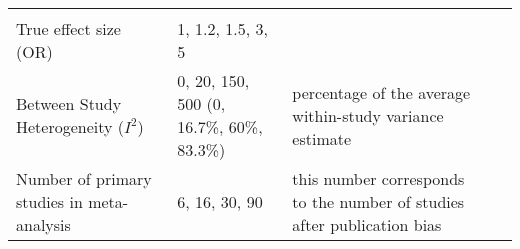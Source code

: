 \documentclass[english,doc,floatsintext]{apa6}
\begin{document}
\begin{longtable}[]{@{}lllll@{}}
\begin{minipage}[t]{0.26\columnwidth}
\strut
\end{minipage} & \begin{minipage}[t]{0.04\columnwidth}\raggedright
\strut
\end{minipage} & \begin{minipage}[t]{0.01\columnwidth}\raggedright
\strut
\end{minipage}\tabularnewline
\begin{minipage}[t]{0.20\columnwidth}\raggedright
True effect size (OR)\strut
\end{minipage} & \begin{minipage}[t]{0.35\columnwidth}\raggedright
1, 1.2, 1.5, 3, 5\strut
\end{minipage} & \begin{minipage}[t]{0.26\columnwidth}\raggedright
\strut
\end{minipage} & \begin{minipage}[t]{0.04\columnwidth}\raggedright
\strut
\end{minipage} & \begin{minipage}[t]{0.01\columnwidth}\raggedright
\strut
\end{minipage}\tabularnewline
\begin{minipage}[t]{0.20\columnwidth}\raggedright
Between Study Heterogeneity (\(I^2\))\strut
\end{minipage} & \begin{minipage}[t]{0.35\columnwidth}\raggedright
0, 20, 150, 500 (0, 16.7\%, 60\%, 83.3\%)\strut
\end{minipage} & \begin{minipage}[t]{0.26\columnwidth}\raggedright
percentage of the average within-study variance estimate\strut
\end{minipage} & \begin{minipage}[t]{0.04\columnwidth}\raggedright
\strut
\end{minipage} & \begin{minipage}[t]{0.01\columnwidth}\raggedright
\strut
\end{minipage}\tabularnewline
\begin{minipage}[t]{0.20\columnwidth}\raggedright
Number of primary studies in meta-analysis\strut
\end{minipage} & \begin{minipage}[t]{0.35\columnwidth}\raggedright
6, 16, 30, 90\strut
\end{minipage} & \begin{minipage}[t]{0.26\columnwidth}\raggedright
this number corresponds to the number of studies after publication bias\strut

\end{minipage}
\end{longtable}
\end{document}
